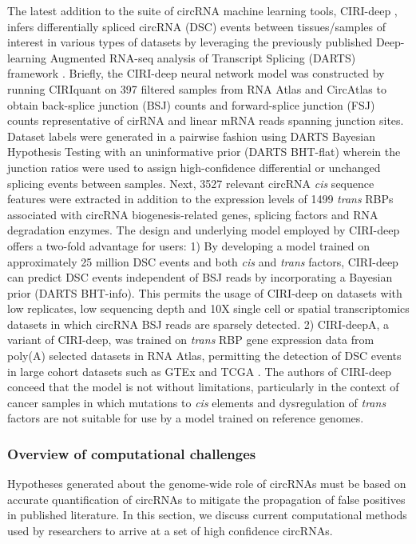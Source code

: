 The latest addition to the suite of circRNA machine learning tools, CIRI-deep \cite{CIRIdeep}, infers differentially spliced circRNA (DSC) events between tissues/samples of interest in various types of datasets by leveraging the previously published Deep-learning Augmented RNA-seq analysis of Transcript Splicing (DARTS) framework \cite{DARTS}. Briefly, the CIRI-deep neural network model was constructed by running CIRIquant \cite{CIRIquant} on 397 filtered samples from RNA Atlas \cite{RNAAtlas} and CircAtlas \cite{circatlas} to obtain back-splice junction (BSJ) counts and forward-splice junction (FSJ) counts representative of cirRNA and linear mRNA reads spanning junction sites. Dataset labels were generated in a pairwise fashion using DARTS Bayesian Hypothesis Testing with an uninformative prior (DARTS BHT-flat) wherein the junction ratios were used to assign high-confidence differential or unchanged splicing events between samples. Next, 3527 relevant circRNA \textit{cis} sequence features were extracted in addition to the expression levels of 1499 \textit{trans} RBPs associated with circRNA biogenesis-related genes, splicing factors and RNA degradation enzymes. The design and underlying model employed by CIRI-deep offers a two-fold advantage for users: 1) By developing a model trained on approximately 25 million DSC events and both \textit{cis} and \textit{trans} factors, CIRI-deep can predict DSC events independent of BSJ reads by incorporating a Bayesian prior (DARTS BHT-info). This permits the usage of CIRI-deep on datasets with low replicates, low sequencing depth and 10X single cell or spatial transcriptomics datasets in which circRNA BSJ reads are sparsely detected. 2) CIRI-deepA, a variant of CIRI-deep, was trained on \textit{trans} RBP gene expression data from poly(A) selected datasets in RNA Atlas, permitting the detection of DSC events in large cohort datasets such as GTEx \cite{GTExConsortium2013Jun} and TCGA \cite{TCGA}. The authors of CIRI-deep conceed that the model is not without limitations, particularly in the context of cancer samples in which mutations to \textit{cis} elements and dysregulation of \textit{trans} factors are not suitable for use by a model trained on reference genomes. 

\subsubsection{Overview of computational challenges}
Hypotheses generated about the genome-wide role of circRNAs must be based on accurate quantification of circRNAs to mitigate the propagation of false positives in published literature. In this section, we discuss current computational methods used by researchers to arrive at a set of high confidence circRNAs.

